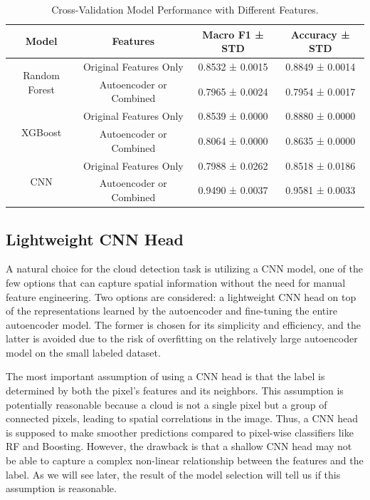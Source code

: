 \documentclass[10pt,letterpaper]{article}
\begin{document}
\begin{table}[ht]
    \centering
    \caption{Cross-Validation Model Performance with Different Features.}
    \label{tab:cv_performance}
    \begin{tabular}{cccc}
    \hline
    \textbf{Model}                 & \textbf{Features}                & \textbf{Macro F1 ± STD} & \textbf{Accuracy ± STD} \\ \hline
    \multirow{2}{*}{Random Forest} & Original Features Only           & 0.8532 ± 0.0015         & 0.8849 ± 0.0014         \\
                                   & Autoencoder or Combined          & 0.7965 ± 0.0024         & 0.7954 ± 0.0017         \\
    \multirow{2}{*}{XGBoost}       & Original Features Only           & 0.8539 ± 0.0000         & 0.8880 ± 0.0000          \\
                                   & Autoencoder or Combined          & 0.8064 ± 0.0000         & 0.8635 ± 0.0000         \\
    \multirow{2}{*}{CNN}           & Original Features Only           & 0.7988 ± 0.0262         & 0.8518 ± 0.0186        \\
                                   & Autoencoder or Combined          & 0.9490 ± 0.0037         & 0.9581 ± 0.0033        \\
    \hline
    \end{tabular}
\end{table}

\subsection{Lightweight CNN Head}

A natural choice for the cloud detection task is utilizing a CNN model, one of the few options that can capture spatial information without the need for manual feature engineering. Two options are considered: a lightweight CNN head on top of the representations learned by the autoencoder and fine-tuning the entire autoencoder model. The former is chosen for its simplicity and efficiency, and the latter is avoided due to the risk of overfitting on the relatively large autoencoder model on the small labeled dataset.

The most important assumption of using a CNN head is that the label is determined by both the pixel's features and its neighbors. This assumption is potentially reasonable because a cloud is not a single pixel but a group of connected pixels, leading to spatial correlations in the image. Thus, a CNN head is supposed to make smoother predictions compared to pixel-wise classifiers like RF and Boosting. However, the drawback is that a shallow CNN head may not be able to capture a complex non-linear relationship between the features and the label. As we will see later, the result of the model selection will tell us if this assumption is reasonable.
\end{document}
